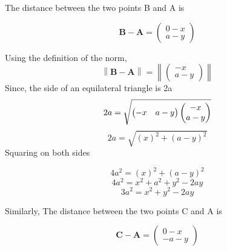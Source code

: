 \documentclass[journal,12pt,twocolumn]{IEEEtran}
\providecommand{\norm}[1]{\left\lVert#1\right\rVert}
\let\vec\mathbf
\newcommand{\myvec}[1]{\ensuremath{\begin{pmatrix}#1\end{pmatrix}}}
\begin{document}

\noindent The distance between the two points B and A is

\begin{equation}	
\vec{B}-\vec{A} = \myvec{0-x \\ a-y}
\end{equation}

\noindent Using the definition   of the norm, 
		\begin{equation}
\norm{\vec{B}-\vec{A}} =\norm{\myvec{-x \\ a-y}}
\end{equation}
\noindent Since, the side of an equilateral triangle is 2a	
\begin{equation}						
			2a=\sqrt{\myvec{-x & a-y}\myvec{-x \\ a-y}} 
\\
\end{equation}
\begin{equation}						
2a =  \sqrt{(x)^2+ (a-y)^2}
\end{equation}
\texttt\noindent Squaring on both sides

\begin{equation}						
4a^2 =  {(x)^2+ (a-y)^2}
\end{equation}
\begin{equation}
4a^2 = {x^2 + a^2 +y^2-2ay}
\end{equation}
\begin{equation}
3a^2 = {x^2+y^2-2ay}
\label{eq-1-}
\end{equation}

\noindent Similarly, The distance between the two points C and A is

\begin{equation}	
\vec{C}-\vec{A} = \myvec{0-x \\ -a-y}
\end{equation}
\end{document}
